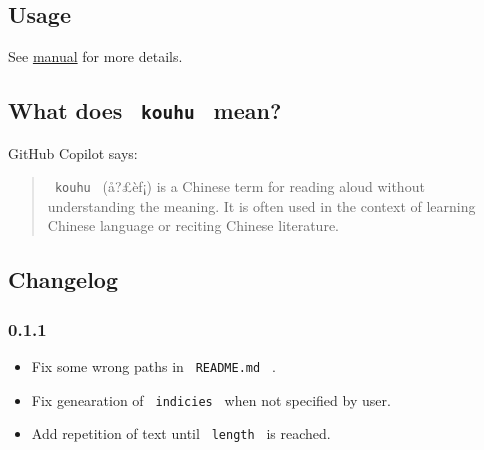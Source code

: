 \subsection{Usage}\label{usage}

\begin{Shaded}
\begin{Highlighting}[]



\end{Highlighting}
\end{Shaded}

See
\href{https://github.com/Harry-Chen/kouhu/blob/master/doc/manual.pdf}{manual}
for more details.

\subsection{\texorpdfstring{What does \texttt{\ kouhu\ }
mean?}{What does  kouhu  mean?}}\label{what-does-kouhu-mean}

GitHub Copilot says:

\begin{quote}
\texttt{\ kouhu\ } (å?£èƒ¡) is a Chinese term for reading aloud without
understanding the meaning. It is often used in the context of learning
Chinese language or reciting Chinese literature.
\end{quote}

\subsection{Changelog}\label{changelog}

\subsubsection{0.1.1}\label{section}

\begin{itemize}
\tightlist
\item
  Fix some wrong paths in \texttt{\ README.md\ } .
\item
  Fix genearation of \texttt{\ indicies\ } when not specified by user.
\item
  Add repetition of text until \texttt{\ length\ } is reached.
\end{itemize}

